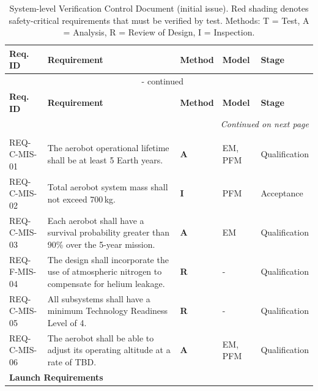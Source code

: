 {\small
\renewcommand{\arraystretch}{1}
\begin{longtable}{p{2.85cm} p{6.2cm} p{1.2cm} p{1.6cm} p{1.8cm}}
\caption{System-level Verification Control Document (initial issue). Red shading denotes safety-critical requirements that must be verified by test. Methods: T = Test, A = Analysis, R = Review of Design, I = Inspection.}
\label{tab:vcd} \\
\toprule
\textbf{Req. ID} & \textbf{Requirement} & \textbf{Method} & \textbf{Model} & \textbf{Stage} \\
\midrule
\endfirsthead
\multicolumn{5}{c}{\tablename\ \thetable{} - continued}\\
\toprule
\textbf{Req. ID} & \textbf{Requirement} & \textbf{Method} & \textbf{Model} & \textbf{Stage} \\
\midrule
\endhead
\midrule
\multicolumn{5}{r}{\textit{Continued on next page}}\\
\endfoot
\bottomrule
\endlastfoot

\multicolumn{5}{l}{\textbf{Mission Requirements}} \\
\midrule

REQ-C-MIS-01 & The aerobot operational lifetime shall be at least 5 Earth years. & \textbf{A} & EM, PFM & Qualification \\
REQ-C-MIS-02 & Total aerobot system mass shall not exceed 700\,kg. & \textbf{I} & PFM & Acceptance \\
REQ-C-MIS-03 & Each aerobot shall have a survival probability greater than 90\% over the 5-year mission. & \textbf{A} & EM & Qualification \\
REQ-F-MIS-04 & The design shall incorporate the use of atmospheric nitrogen to compensate for helium leakage. & \textbf{R} & - & Qualification \\
REQ-C-MIS-05 & All subsystems shall have a minimum Technology Readiness Level of 4. & \textbf{R} & - & Qualification \\
REQ-C-MIS-06 & The aerobot shall be able to adjust its operating altitude at a rate of TBD. & \textbf{A} & EM, PFM & Qualification \\

\midrule
\multicolumn{5}{l}{\textbf{Launch Requirements}} \\
\midrule


\end{longtable}}
